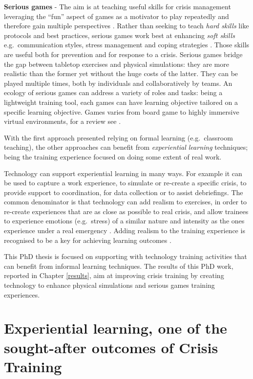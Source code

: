 \textbf{Serious games} - The aim is at teaching useful skills for crisis management leveraging the ``fun'' aspect of games as a motivator to play repeatedly and therefore gain multiple perspectives \autocite{DiLoreto:2012bj}. Rather than seeking to teach \emph{hard skills} like protocols and best practices, serious games work best at enhancing \emph{soft skills} e.g.~communication styles, stress management and coping strategies \autocite{Sagun:2009ks}. Those skills are useful both for prevention and for response to a crisis. Serious games bridge the gap between tabletop exercises and physical simulations: they are more realistic than the former yet without the huge costs of the latter. They can be played multiple times, both by individuals and collaboratively by teams. An ecology of serious games can address a variety of roles and tasks: being a lightweight training tool, each games can have learning objective tailored on a specific learning objective. Games varies from board game to highly immersive virtual environments, for a review see \autocite{DiLoreto:2012bj}.

With the first approach presented relying on formal learning (e.g.~classroom teaching), the other approaches can benefit from \emph{experiential learning} \autocite{kolb1984organizational} techniques; being the training experience focused on doing some extent of real work.

Technology can support experiential learning in many ways. For example it can be used to capture a work experience, to simulate or re-create a specific crisis, to provide support to coordination, for data collection or to assist debriefings. The common denominator is that technology can add realism to exercises, in order to re-create experiences that are as close as possible to real crisis, and allow trainees to experience emotions (e.g.~stress) of a similar nature and intensity as the ones experience under a real emergency \autocite{MacKinnon:2012wz}. Adding realism to the training experience is recognised to be a key for achieving learning outcomes \autocite{Asproth:2013vs}.

This PhD thesis is focused on supporting with technology training activities that can benefit from informal learning techniques. The results of this PhD work, reported in Chapter \ref{results}, aim at improving crisis training by creating technology to enhance physical simulations and serious games training experiences.

\section{Experiential learning, one of the sought-after outcomes of Crisis Training}\label{experiential-learning-one-of-the-sought-after-outcomes-of-crisis-training}

